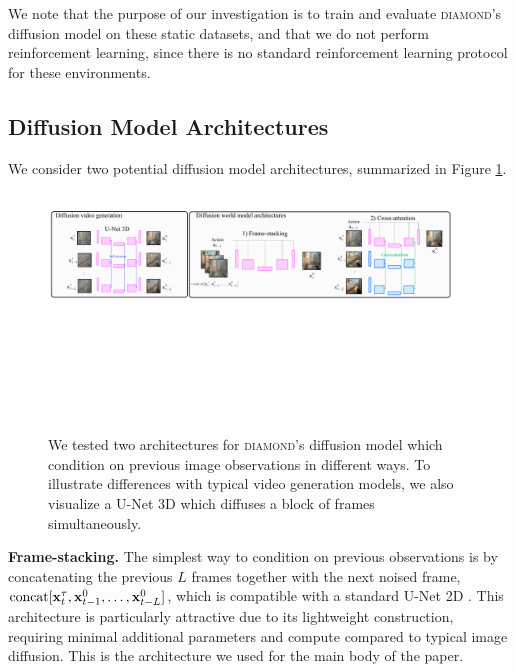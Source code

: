We note that the purpose of our investigation is to train and evaluate \textsc{diamond}'s diffusion model on these static datasets, and that we do not perform reinforcement learning, since there is no standard reinforcement learning protocol for these environments.


\subsection{Diffusion Model Architectures}

We consider two potential diffusion model architectures, summarized in Figure \ref{fig_architectures}.

\begin{figure}[h]
    \begin{center}
    \includegraphics[width=0.99\columnwidth]{images/architectures_02.pdf}
    \caption{We tested two architectures for \textsc{diamond}'s diffusion model which condition on previous image observations in different ways. To illustrate differences with typical video generation models, we also visualize a U-Net 3D \citep{unet3d} which diffuses a block of frames simultaneously.}
    \label{fig_architectures}
    \end{center}
\end{figure}

\textbf{Frame-stacking.} The simplest way to condition on previous observations is by concatenating the previous $L$ frames together with the next noised frame, $\operatorname{concat}[ \mathbf{x}_t^{\tau}, \mathbf{x}_{t-1}^0, \dots, \mathbf{x}_{t-L}^0]$, which is compatible with a standard U-Net 2D \citep{ronneberger2015unet}.
This architecture is particularly attractive due to its lightweight construction, requiring minimal additional parameters and compute compared to typical image diffusion. This is the architecture we used for the main body of the paper.

